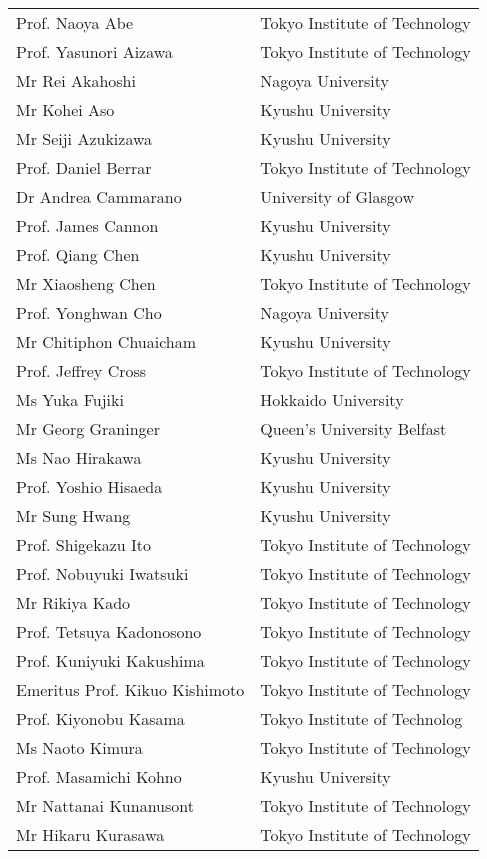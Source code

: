 \begin{longtable}{ll}
Prof. Naoya Abe & Tokyo Institute of Technology \\
Prof. Yasunori Aizawa & Tokyo Institute of Technology \\
Mr  Rei Akahoshi & Nagoya University \\
Mr  Kohei Aso & Kyushu University \\
Mr  Seiji Azukizawa & Kyushu University \\
Prof. Daniel Berrar & Tokyo Institute of Technology \\
Dr Andrea Cammarano & University of Glasgow \\
Prof. James Cannon & Kyushu University \\
Prof. Qiang Chen & Kyushu University \\
Mr  Xiaosheng Chen & Tokyo Institute of Technology \\
Prof. Yonghwan Cho & Nagoya University \\
Mr  Chitiphon Chuaicham & Kyushu University \\
Prof. Jeffrey Cross & Tokyo Institute of Technology \\
Ms  Yuka Fujiki & Hokkaido University \\
Mr  Georg Graninger & Queen's University Belfast \\
Ms  Nao Hirakawa & Kyushu University \\
Prof. Yoshio Hisaeda & Kyushu University \\
Mr  Sung Hwang & Kyushu University \\
Prof. Shigekazu Ito & Tokyo Institute of Technology \\
Prof. Nobuyuki Iwatsuki & Tokyo Institute of Technology \\
Mr  Rikiya Kado & Tokyo Institute of Technology \\
Prof. Tetsuya Kadonosono & Tokyo Institute of Technology \\
Prof. Kuniyuki Kakushima & Tokyo Institute of Technology \\
Emeritus Prof. Kikuo Kishimoto & Tokyo Institute of Technology \\
Prof. Kiyonobu Kasama & Tokyo Institute of Technolog \\
Ms  Naoto Kimura & Tokyo Institute of Technology \\
Prof. Masamichi Kohno & Kyushu University \\
Mr  Nattanai Kunanusont & Tokyo Institute of Technology \\
Mr  Hikaru Kurasawa & Tokyo Institute of Technology \\

\end{longtable}
